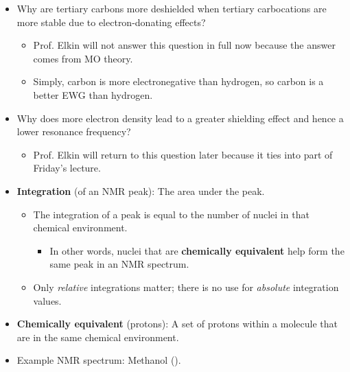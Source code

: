 \documentclass[../notes.tex]{subfiles}
\begin{document}
\begin{itemize}
\begin{itemize}
    \end{itemize}
    \item Why are tertiary carbons more deshielded when tertiary carbocations are more stable due to electron-donating effects?
    \begin{itemize}
        \item Prof. Elkin will not answer this question in full now because the answer comes from MO theory.
        \item Simply, carbon is more electronegative than hydrogen, so carbon is a better EWG than hydrogen.
    \end{itemize}
    \pagebreak
    \item Why does more electron density lead to a greater shielding effect and hence a lower resonance frequency?
    \begin{itemize}
        \item Prof. Elkin will return to this question later because it ties into part of Friday's lecture.
    \end{itemize}
    \item \textbf{Integration} (of an NMR peak): The area under the peak.
    \begin{itemize}
        \item The integration of a peak is equal to the number of nuclei in that chemical environment.
        \begin{itemize}
            \item In other words, nuclei that are \textbf{chemically equivalent} help form the same peak in an NMR spectrum.
        \end{itemize}
        \item Only \emph{relative} integrations matter; there is no use for \emph{absolute} integration values.
    \end{itemize}
    \item \textbf{Chemically equivalent} (protons): A set of protons within a molecule that are in the same chemical environment.
    \item Example NMR spectrum: Methanol ().
    \begin{figure}[h!]
        \centering
\end{figure}
\end{itemize}
\end{document}
